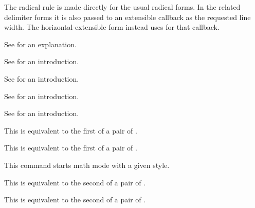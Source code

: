 The radical rule is made directly for the usual radical forms. In the related
delimiter forms it is also passed to an extensible callback as the requested line
width. The horizontal-extensible form instead uses  for
that callback.

\stopnewprimitive

\startnewprimitive[title={\prm {Uright}}]

See  for an explanation.

\stopnewprimitive

\startnewprimitive[title={\prm {Uroot}}]

See  for an introduction.

\stopnewprimitive

\startnewprimitive[title={\prm {Urooted}}]

See  for an introduction.

\stopnewprimitive

\startnewprimitive[title={\prm {Uskewed}}]

See  for an introduction.

\stopnewprimitive

\startnewprimitive[title={\prm {Uskewedwithdelims}}]

See  for an introduction.

\stopnewprimitive

\startnewprimitive[title={\prm {Ustartdisplaymath}}]

This is equivalent to the first of a pair of \type {$$}.

\stopnewprimitive

\startnewprimitive[title={\prm {Ustartmath}}]

This is equivalent to the first of a pair of \type {$}.

\stopnewprimitive

\startnewprimitive[title={\prm {Ustartmathmode}}]

This command starts math mode with a given style.

\stopnewprimitive

\startnewprimitive[title={\prm {Ustopdisplaymath}}]

This is equivalent to the second of a pair of \type {$$}.

\stopnewprimitive

\startnewprimitive[title={\prm {Ustopmath}}]

This is equivalent to the second of a pair of \type {$}.

